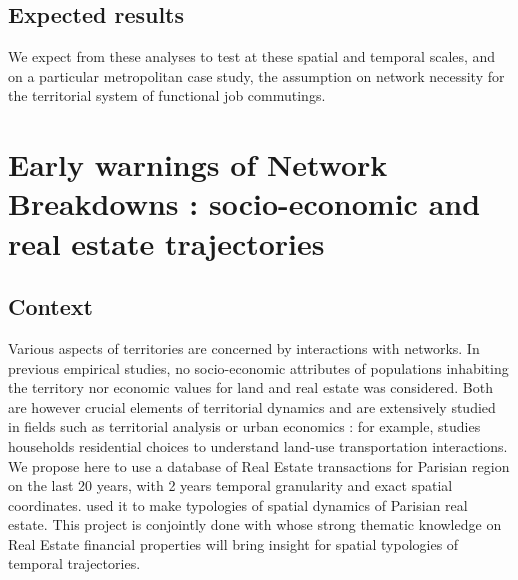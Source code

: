 




\bigskip

\subsection{Expected results}

We expect from these analyses to test at these spatial and temporal scales, and on a particular metropolitan case study, the assumption on network necessity for the territorial system of functional job commutings.







\newpage

\section[Real Estate Trajectories]{Early warnings of Network Breakdowns : socio-economic and real estate trajectories}


\subsection{Context}

Various aspects of territories are concerned by interactions with networks. In previous empirical studies, no socio-economic attributes of populations inhabiting the territory nor economic values for land and real estate was considered. Both are however crucial elements of territorial dynamics and are extensively studied in fields such as territorial analysis or urban economics : for example, \cite{homocianu:tel-00359302} studies households residential choices to understand land-use transportation interactions. We propose here to use a database of Real Estate transactions for Parisian region on the last 20 years, with 2 years temporal granularity and exact spatial coordinates. \cite{guerois2009dynamique} used it to make typologies of spatial dynamics of Parisian real estate. This project is conjointly done with  whose strong thematic knowledge on Real Estate financial properties will bring insight for spatial typologies of temporal trajectories.%



